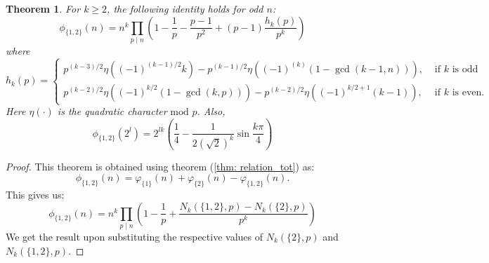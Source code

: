 \documentclass[10pt,a4paper]{amsart}
\newtheorem{thm}{Theorem}
\begin{document}
\begin{thm}\label{thm: tot_func2{1,2}}
    For $k\geq 2$, the following identity holds for odd $n$:\[
    \phi_{\{1,2\}}(n)=n^k\prod_{p\mid n}\left(1-\frac{1}{p}-\frac{p-1}{p^2}+(p-1)\frac{h_k(p)}{p^k}\right)
    \]
    where\[
    h_k(p)=\begin{cases}
        p^{(k-3)/2}\eta((-1)^{(k-1)/2}k)-p^{(k-1)/2}\eta((-1)^{(k)}(1-\gcd(k-1, n))), &\text{ if }k\text{ is odd}\\
        p^{(k-2)/2}\eta((-1)^{k/2}(1-\gcd(k,p)))-
         p^{(k-2)/2}\eta((-1)^{k/2+1}(k-1)), &\text{ if }k\text{ is even}.
    \end{cases}
    \]
    Here $\eta(\cdot)$ is the quadratic character$\text{ mod } p$.
     Also,
    \[
    \phi_{\{1,2\}}(2^l)=2^{lk}\left(\frac{1}{4}-\frac{1}{2\left(\sqrt{2}\right)^k}\sin\frac{k\pi}{4}\right)
    \]
\end{thm}

\begin{proof}
    This theorem is obtained using theorem (\ref{thm: relation_tot}) as:
    \[
    \phi_{\{1,2\}}(n)=\varphi_{\{1\}}(n)+\varphi_{\{2\}}(n)-\varphi_{\{1,2\}}(n).
    \]
    This gives us:
    \[
    \phi_{\{1,2\}}(n)=n^k\prod_{p\mid n}\left(1-\frac{1}{p}+\frac{N_k(\{1,2\},p)-N_k(\{2\},p)}{p^k}\right)
    \]
    We get the result upon substituting the respective values of $N_k(\{2\},p)$ and $N_k(\{1,2\},p)$.
\end{proof}
\end{document}
